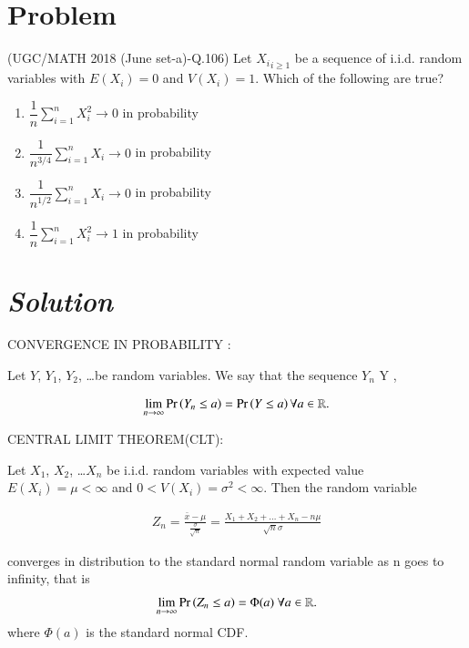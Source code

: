\documentclass[journal,12pt,twocolumn]{IEEEtran}
\begin{document}
\section{Problem}
(UGC/MATH 2018 (June set-a)-Q.106) Let ${X_i}_{i \geq 1}$ be a sequence of i.i.d. random variables with $E(X_i)=0$ and $V(X_i)=1$. Which of the following are true?
\vspace{0.2cm}
\begin{enumerate}
    \item $\dfrac{1}{n} \sum_{i=1}^n X_i^2 \to 0$ in probability 
    \item $\dfrac{1}{n^{3/4}} \sum_{i=1}^n X_i \to 0$ in probability 
    \item $\dfrac{1}{n^{1/2}} \sum_{i=1}^n X_i \to 0$ in probability 
    \item $\dfrac{1}{n} \sum_{i=1}^n X_i^2 \to 1$ in probability
\end{enumerate}

\section*{\emph{Solution}}
CONVERGENCE IN PROBABILITY :

Let $Y$, $Y_1$, $Y_2$, \ldots be random variables. We say that the sequence {$Y_n$} \to Y , 

\begin{align}
    \lim_{n \to \infty}\Pr\left(Y_n \leq a\right)=\Pr\left(Y \leq a\right)  \forall a \in \mathbb{R}.
\end{align}

CENTRAL LIMIT THEOREM(CLT):

Let $X_1$, $X_2$, \ldots $X_n$ be i.i.d. random variables with expected value $E(X_i)=\mu < \infty$  and $0 < V(X_i)=\sigma^2 < \infty$. Then the random variable 

\begin{align}
    Z_n = \frac{\bar{x} - \mu}{\frac{\sigma}{\sqrt{n}}} = \frac{X_1 + X_2 + \ldots + X_n - n\mu}{\sqrt{n}\sigma}
\end{align}

converges in distribution to the standard normal random variable as n goes to infinity, that is
\begin{align}
    \lim_{n \to \infty}\Pr\left(Z_n \leq a\right) = \Phi(a)   \text{        }\forall a \in \mathbb{R}.
\end{align}
where $\Phi(a)$ is the standard normal CDF.
\end{document}
